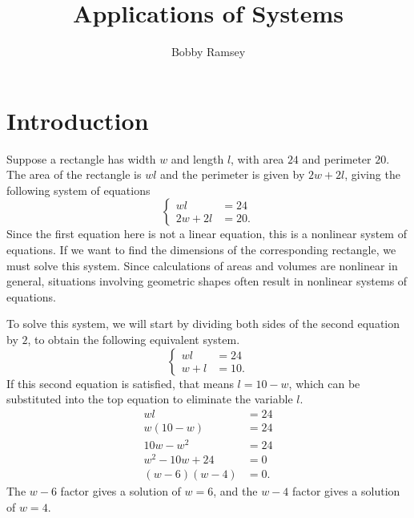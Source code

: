 \documentclass[nooutcomes]{ximera}
\author{Bobby Ramsey}
\title{Applications of Systems}
\begin{document}
\begin{abstract}
  
\end{abstract}
\maketitle


\section{Introduction}
	Suppose a rectangle has width $w$ and length $l$, with area $24$ and perimeter $20$. The area of the rectangle is $wl$ and the perimeter is given by $2w + 2l$, 
	giving the following system of equations
	$$	\begin{cases}
			wl &= 24\\
			2w + 2l &= 20.
		\end{cases}	$$
	Since the first equation here is not a linear equation, this is a nonlinear system of equations. If we want to find the dimensions of the corresponding rectangle, we must solve
	this system. Since calculations of areas and volumes are nonlinear in general, situations involving geometric shapes often result in nonlinear systems of equations. 
	 
	To solve this system, we will start by dividing both sides of the second equation by $2$, to obtain the following equivalent system. 
	$$	\begin{cases}
			wl &= 24\\
			w + l &= 10.
		\end{cases}	$$
	If this second equation is satisfied, that means $l = 10-w$, which can be substituted into the top equation to eliminate the variable $l$.
	\begin{align*}
		wl &= 24\\
		w(10-w) &= 24\\
		10w- w^2 &= 24\\
		w^2 - 10w + 24 &=0\\
		(w-6)(w-4) &= 0.
	\end{align*}	
	The $w-6$ factor gives a solution of $w=6$, and the $w-4$ factor gives a solution of $w=4$.		
	
\end{document}
